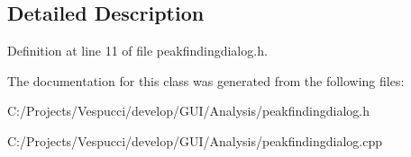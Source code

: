 \subsection{Detailed Description}


Definition at line 11 of file peakfindingdialog.\+h.



The documentation for this class was generated from the following files\+:\begin{DoxyCompactItemize}
\item 
C\+:/\+Projects/\+Vespucci/develop/\+G\+U\+I/\+Analysis/peakfindingdialog.\+h\item 
C\+:/\+Projects/\+Vespucci/develop/\+G\+U\+I/\+Analysis/peakfindingdialog.\+cpp\end{DoxyCompactItemize}

